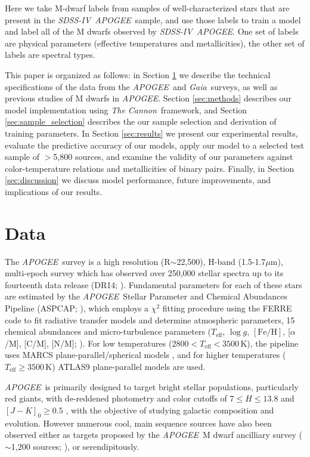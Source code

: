 \documentclass[twocolumn]{aastex62}
\newcommand{\apogee}{\textsl{APOGEE}}
\newcommand{\thecannon}{\textsl{The Cannon}}
\newcommand{\gaia}{\textsl{Gaia}}
\newcommand{\sdssiv}{\textsl{SDSS-IV}}
\newcommand{\teff}{T_{\mathrm{eff}}}
\newcommand{\logg}{\log g}
\newcommand{\feh}{[{\mathrm{Fe}/\mathrm{H}}]}
\begin{document}
Here we take M-dwarf labels from samples of well-characterized stars that are present in the
\sdssiv\ \apogee\ sample, and use those labels to train a model and label all of the M dwarfs observed by
\sdssiv\ \apogee. One set of labels are physical parameters (effective temperatures and metallicities), the other set of labels are spectral types. 

This paper is organized as follows: in Section \ref{sec:data} we describe the technical specifications of the data from the \apogee\ and \gaia\ surveys, as well as previous studies of M dwarfs in \apogee.
Section \ref{sec:methods} describes our model implementation using \thecannon\ framework, and Section \ref{sec:sample_selection} describes the our sample selection and derivation of training parameters.
In Section \ref{sec:results} we present our experimental results, evaluate the predictive accuracy of our models, apply our model to a selected test sample of $>$5,800 sources, and examine the validity of our parameters against color-temperature relations and metallicities of binary pairs.
Finally, in Section \ref{sec:discussion} we discuss model performance, future improvements, and implications of our results. 


\section{Data} \label{sec:data}

The \apogee\ survey is a high resolution (R$\sim$22,500), H-band (1.5-1.7$\mu$m), multi-epoch survey which has observed over 250,000 stellar spectra up to its fourteenth data release (DR14; \citealt{Abolfathi:2017}). Fundamental parameters for each of these stars are estimated by the \apogee\ Stellar Parameter and Chemical Abundances Pipeline (ASPCAP; \citealt{Perez:2016}), which employs a $\chi^2$ fitting procedure using the FERRE code to fit radiative transfer models and determine atmospheric parameters, 15 chemical abundances and micro-turbulence parameters ($\teff$, $\logg$, $\feh$, [$\alpha$/M], [C/M], [N/M]; \citealt{Meszaros:2012}). For low temperatures ($2800<\teff<3500$\,K), the pipeline uses MARCS plane-parallel/spherical models \citep{Gustafsson:2008}, and for higher temperatures ($\teff\geq3500$\,K) ATLAS9 \citep{Castelli:2004} plane-parallel models are used.

\apogee\ is primarily designed to target bright stellar populations, particularly red giants, with de-reddened photometry and color cutoffs of $7 \leq H \leq 13.8$ and $[J-K]_0 \geq 0.5$ \citep{Zasowski:2013}, with the objective of studying galactic composition and evolution. However numerous cool, main sequence sources have also been observed either as targets proposed by the \apogee\ M dwarf ancilliary survey ($\sim$1,200 sources; \citealt{Desphande:2013}), or serendipitously. 
\end{document}
